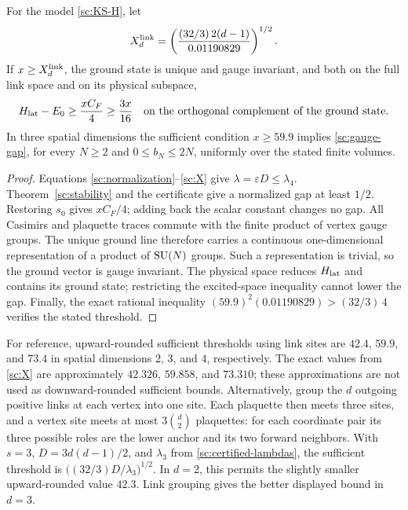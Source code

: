 \begin{corollary}
\label{sc:gauge-corollary}
For the model \eqref{sc:KS-H}, let
\begin{equation}
 X_d^{\rm link}
  =\left(\frac{(32/3)\,2(d-1)}{0.01190829}\right)^{1/2}.
 \label{sc:X}
\end{equation}
If $x\ge X_d^{\rm link}$, the ground state is unique and gauge
invariant, and both on the full link space and on its physical
subspace,
\begin{equation}
 H_{\rm lat}-E_0\ge\frac{xC_F}{4}\ge\frac{3x}{16}
 \quad\hbox{on the orthogonal complement of the ground state}.
 \label{sc:gauge-gap}
\end{equation}
In three spatial dimensions the sufficient condition $x\ge59.9$
implies \eqref{sc:gauge-gap}, for every $N\ge2$ and
$0\le b_N\le2N$, uniformly over the stated finite volumes.
\end{corollary}
\begin{proof}
Equations \eqref{sc:normalization}--\eqref{sc:X} give
$\lambda=\varepsilon D\le\lambda_4$.
Theorem~\ref{sc:stability} and the certificate give a normalized
gap at least $1/2$. Restoring $s_0$ gives $xC_F/4$; adding back
the scalar constant changes no gap. All Casimirs and plaquette
traces commute with the finite product of vertex gauge groups.
The unique ground line therefore carries a continuous one-dimensional
representation of a product of $\operatorname{SU}(N)$ groups. Such a representation
is trivial, so the ground vector is gauge invariant. The physical
space reduces $H_{\rm lat}$ and contains its ground state;
restricting the excited-space inequality cannot lower the gap.
Finally, the exact rational inequality
$(59.9)^2(0.01190829)>(32/3)\,4$ verifies the stated threshold.
\end{proof}

For reference, upward-rounded sufficient thresholds using link sites
are $42.4$, $59.9$, and $73.4$ in spatial dimensions $2$, $3$, and $4$,
respectively. The exact values from \eqref{sc:X} are approximately
$42.326$, $59.858$, and $73.310$; these approximations are not used
as downward-rounded sufficient bounds.
Alternatively, group the $d$ outgoing positive links at each vertex
into one site. Each plaquette then meets three sites, and a vertex
site meets at most $3\binom d2$ plaquettes: for each coordinate pair
its three possible roles are the lower anchor and its two forward
neighbors. With $s=3$, $D=3d(d-1)/2$, and $\lambda_3$ from
\eqref{sc:certified-lambdas}, the sufficient threshold is
$\bigl((32/3)D/\lambda_3\bigr)^{1/2}$.
In $d=2$, this permits the slightly smaller upward-rounded value
$42.3$. Link grouping gives the better displayed bound in $d=3$.

